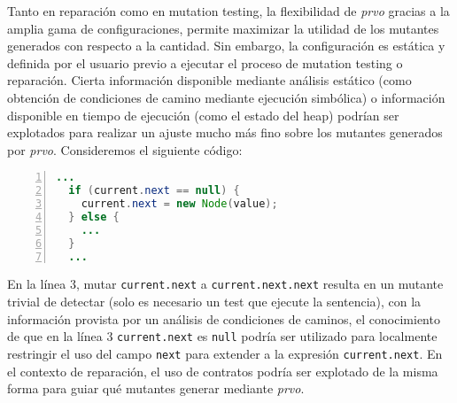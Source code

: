 Tanto en reparaci\'on como en mutation testing, la flexibilidad de \emph{prvo} gracias a la amplia gama de configuraciones, permite maximizar la utilidad de los mutantes generados con respecto a la cantidad. Sin embargo, la configuraci\'on es est\'atica y definida por el usuario previo a ejecutar el proceso de mutation testing o reparaci\'on. Cierta informaci\'on disponible mediante an\'alisis est\'atico (como obtenci\'on de condiciones de camino mediante ejecuci\'on simb\'olica) o informaci\'on disponible en tiempo de ejecuci\'on (como el estado del heap) podr\'ian ser explotados para realizar un ajuste mucho m\'as fino sobre los mutantes generados por \emph{prvo}. Consideremos el siguiente c\'odigo:
\begin{lstlisting}[frame=single, numbers=left, mathescape=true,language=Java,basicstyle={},framexleftmargin=.073\textwidth,xleftmargin=.085\textwidth,xrightmargin=0.012\textwidth]
  ...
  if (current.next == null) {
    current.next = new Node(value);
  } else {
    ...
  }
  ...
\end{lstlisting}
En la l\'inea $3$, mutar \texttt{current.next} a \texttt{current.next.next} resulta en un mutante trivial de detectar (solo es necesario un test que ejecute la sentencia), con la informaci\'on provista por un an\'alisis de condiciones de caminos, el conocimiento de que en la l\'inea $3$ \texttt{current.next} es \texttt{null} podr\'ia ser utilizado para localmente restringir el uso del campo \texttt{next} para extender a la expresi\'on \texttt{current.next}.
En el contexto de reparaci\'on, el uso de contratos podr\'ia ser explotado de la misma forma para guiar qu\'e mutantes generar mediante \emph{prvo}.